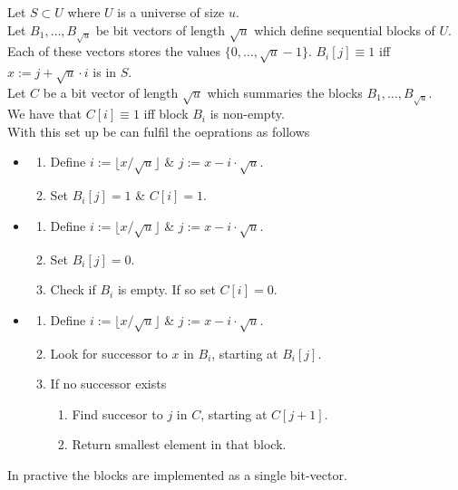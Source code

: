 \documentclass[11pt,a4paper]{article}
\begin{document}
Let $S\subset U$ where $U$ is a universe of size $u$.\\
Let $B_1,\dots,B_{\sqrt{u}}$ be bit vectors of length $\sqrt{u}$ which define sequential blocks of $U$.\\
Each of these vectors stores the values $\{0,\dots,\sqrt{u}-1\}$. $B_i[j]\equiv1$ iff $x:=j+\sqrt{u}\cdot i$ is in $S$.\\
Let $C$ be a bit vector of length $\sqrt{u}$ which summaries the blocks $B_1,\dots,B_{\sqrt{u}}$.\\
We have that $C[i]\equiv1$ iff block $B_i$ is non-empty.\\
With this set up be can fulfil the oeprations as follows
\begin{itemize}
	\item[\lstinline!add(x)!]
	\begin{enumerate}
		\item Define $i:=\lfloor x/\sqrt{u}\rfloor$ \& $j:=x-i\cdot\sqrt{u}$.
		\item Set $B_i[j]=1$ \& $C[i]=1$.
	\end{enumerate}
	\item[\lstinline!delete(x)!]
	\begin{enumerate}
		\item Define $i:=\lfloor x/\sqrt{u}\rfloor$ \& $j:=x-i\cdot\sqrt{u}$.
		\item Set $B_i[j]=0$.
		\item Check if $B_i$ is empty. If so set $C[i]=0$.
	\end{enumerate}
	\item[\lstinline!successor(x)!]
	\begin{enumerate}
		\item Define $i:=\lfloor x/\sqrt{u}\rfloor$ \& $j:=x-i\cdot\sqrt{u}$.
		\item Look for successor to $x$ in $B_i$, starting at $B_i[j]$.
		\item If no successor exists
		\begin{enumerate}
			\item Find succesor to $j$ in $C$, starting at $C[j+1]$.
			\item Return smallest element in that block.
		\end{enumerate}
	\end{enumerate}
\end{itemize}
\nb In practive the blocks are implemented as a single bit-vector.\\
\end{document}
